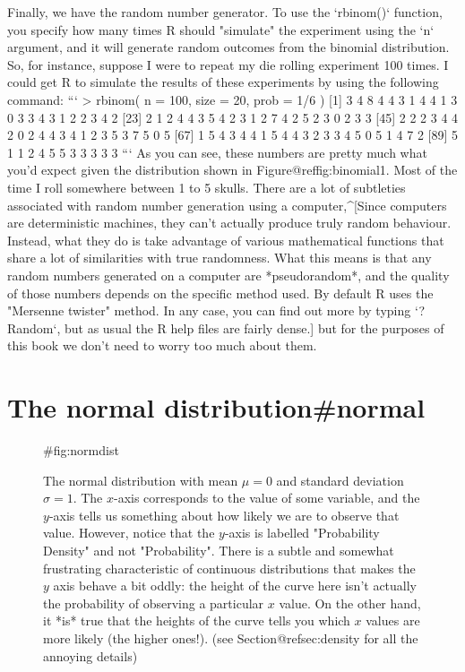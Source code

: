 Finally, we have the random number generator. To use the `rbinom()` function, you specify how many times R should "simulate" the experiment using the `n` argument, and it will generate random outcomes from the binomial distribution. So, for instance, suppose I were to repeat my die rolling experiment 100 times. I could get R to simulate the results of these experiments by using the following command:
```
> rbinom( n = 100, size = 20, prob = 1/6 )
  [1] 3 4 8 4 4 3 1 4 4 1 3 0 3 3 4 3 1 2 2 3 4 2
 [23] 2 1 2 4 4 3 5 4 2 3 1 2 7 4 2 5 2 3 0 2 3 3
 [45] 2 2 2 3 4 4 2 0 2 4 4 3 4 1 2 3 5 3 7 5 0 5
 [67] 1 5 4 3 4 4 1 5 4 4 3 2 3 3 4 5 0 5 1 4 7 2
 [89] 5 1 1 2 4 5 5 3 3 3 3 3
```
As you can see, these numbers are pretty much what you'd expect given the distribution shown in Figure@reffig:binomial1. Most of the time I roll somewhere between 1 to 5 skulls. There are a lot of subtleties associated with random number generation using a computer,^[Since computers are  deterministic machines, they can't actually produce truly random behaviour. Instead, what they do is take advantage of various mathematical functions that share a lot of similarities with true randomness. What this means is that any random numbers generated on a computer are *pseudorandom*, and the quality of those numbers depends on the specific method used. By default R uses the "Mersenne twister" method. In any case, you can find out more by typing `?Random`, but as usual the R help files are fairly dense.] but for the purposes of this book we don't need to worry too much about them.


\section{The normal distribution{#normal}}


\begin{figure}[t]
\begin{center}
\caption{The normal distribution with mean $\mu = 0$ and standard deviation $\sigma = 1$. The $x$-axis corresponds to the value of some variable, and the $y$-axis tells us something about how likely we are to observe that value. However, notice that the $y$-axis is labelled "Probability Density" and not "Probability". There is a subtle and somewhat frustrating characteristic of continuous distributions that makes the $y$ axis behave a bit oddly: the height of the curve here isn't actually the probability of observing a particular $x$ value. On the other hand, it *is* true that the heights of the curve tells you which $x$ values are more likely (the higher ones!). (see Section@refsec:density for all the annoying details)}
\HR
{#fig:normdist}
\end{center}
\end{figure}



